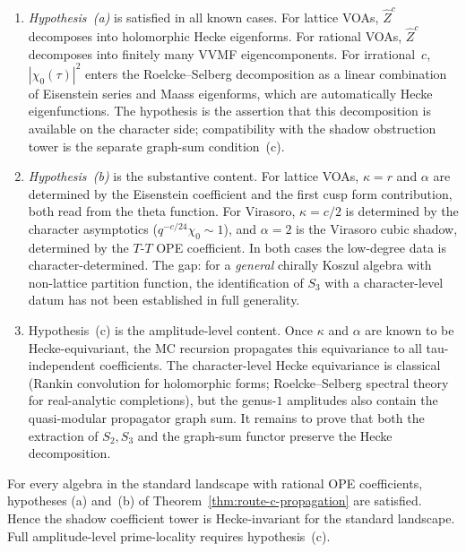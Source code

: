 \begin{remark}%
\label{rem:route-c-hypotheses}%
\mbox{}
\begin{enumerate}[label=\textup{(\roman*)}]
\item \emph{Hypothesis~\textup{(a)}} is satisfied in all
 known cases. For lattice VOAs, $\widehat{Z}^c$ decomposes
 into holomorphic Hecke eigenforms. For rational VOAs,
 $\widehat{Z}^c$ decomposes into finitely many VVMF
 eigencomponents. For irrational~$c$,
 $|\chi_0(\tau)|^2$ enters the Roelcke--Selberg decomposition
 as a linear combination of Eisenstein series and Maass
 eigenforms, which are automatically Hecke eigenfunctions.
 The hypothesis is the assertion that this decomposition is available
 on the character side; compatibility with the shadow obstruction
 tower is the separate graph-sum condition~\textup{(c)}.

\item \emph{Hypothesis~\textup{(b)}} is the substantive
 content. For lattice VOAs, $\kappa = r$ and
 $\alpha$ are determined by the Eisenstein coefficient
 and the first cusp form contribution, both read from the
 theta function. For Virasoro, $\kappa = c/2$ is
 determined by the character asymptotics
 ($q^{-c/24}\chi_0 \sim 1$), and $\alpha = 2$ is the
 Virasoro cubic shadow, determined by the $T$-$T$ OPE
 coefficient. In both cases the low-degree data is
 character-determined. The gap: for a \emph{general}
 chirally Koszul algebra with non-lattice partition
 function, the identification of $S_3$ with a
 character-level datum has not been established in full
 generality.

\item Hypothesis~\textup{(c)} is the amplitude-level content.
 Once $\kappa$ and $\alpha$ are known to be Hecke-equivariant, the
 MC recursion propagates this equivariance to all
 tau-independent coefficients. The
 character-level Hecke equivariance is classical (Rankin
 convolution for holomorphic forms; Roelcke--Selberg
 spectral theory for real-analytic completions), but the genus-$1$
 amplitudes also contain the quasi-modular propagator graph sum.
 It remains to prove that both the extraction of
 $S_2,S_3$ and the graph-sum functor preserve the Hecke
 decomposition.
\end{enumerate}
\end{remark}

\begin{corollary}%
\label{cor:route-c-standard-landscape}%
For every algebra in the standard landscape with rational
OPE coefficients, hypotheses
\textup{(a)} and~\textup{(b)} of
Theorem~\textup{\ref{thm:route-c-propagation}} are
satisfied. Hence the shadow coefficient tower is Hecke-invariant
for the standard landscape. Full amplitude-level prime-locality
requires hypothesis~\textup{(c)}.
\end{corollary}


